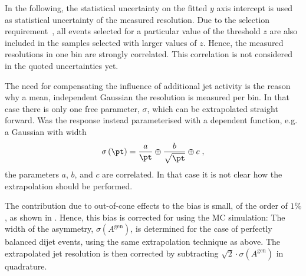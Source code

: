 In the following, the statistical uncertainty on the fitted $y$ axis
intercept is used as statistical uncertainty of the measured resolution.
Due to the selection requirement~,
all events selected for a particular value of the threshold $z$ are
also included in the samples selected with larger values of $z$.
Hence, the measured resolutions in one \ptave bin are strongly correlated.
This correlation is not considered in the quoted uncertainties yet.

The need for compensating the influence of additional jet activity is
the reason why a mean, \pt independent Gaussian the resolution is
measured per \ptave bin.
In that case there is only one free parameter, $\sigma$, which can be
extrapolated straight forward.
Was the response instead parameterised with a \pt dependent function,
e.g. a Gaussian with width
\begin{equation*}
  \sigma\left(\pt\right) = \frac{a}{\pt} \oplus \frac{b}{\sqrt{\pt}}
  \oplus c \;,
\end{equation*}
the parameters $a$, $b$, and $c$ are correlated.
In that case it is not clear how the extrapolation should be performed.

The contribution due to out-of-cone effects to the bias is small, of
the order of $1\%$, as shown in
.
Hence, this bias is corrected for using the MC simulation:
The width of the \ptgen asymmetry, $\sigma(A^{\text{gen}})$, is determined for the
 case of perfectly balanced dijet events, using the
same extrapolation technique as above.
The extrapolated jet \pt resolution is then corrected by 
subtracting $\sqrt{2}\cdot\sigma(A^{\text{gen}})$ in quadrature.

